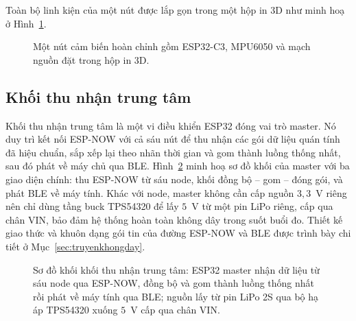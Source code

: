 \documentclass[../DoAn.tex]{subfiles}
\begin{document}
Toàn bộ linh kiện của một nút được lắp gọn trong một hộp in 3D như minh hoạ ở
Hình~\ref{fig:node_photo}.

\begin{figure}[h]
    \centering
    \caption{Một nút cảm biến hoàn chỉnh gồm ESP32-C3, MPU6050 và mạch nguồn đặt trong hộp in 3D.}
    \label{fig:node_photo}
\end{figure}

\subsection{Khối thu nhận trung tâm}
\label{subsec:hw_master}
Khối thu nhận trung tâm là một vi điều khiển ESP32 đóng vai trò master. Nó duy trì
kết nối ESP-NOW với cả sáu nút để thu nhận các gói dữ liệu quán tính đã hiệu chuẩn,
sắp xếp lại theo nhãn thời gian và gom thành luồng thống nhất, sau đó phát về máy
chủ qua BLE. Hình~\ref{fig:masterblock} minh hoạ sơ đồ khối của master với ba giao diện
chính: thu ESP-NOW từ sáu node, khối đồng bộ -- gom -- đóng gói, và phát BLE về
máy tính. Khác với node, master không cần cấp nguồn $3{,}3$~V riêng nên chỉ dùng
tầng buck TPS54320 để lấy $5$~V từ một pin LiPo riêng, cấp qua chân VIN, bảo đảm
hệ thống hoàn toàn không dây trong suốt buổi đo. Thiết kế giao
thức và khuôn dạng gói tin của đường ESP-NOW và BLE được trình bày chi tiết ở
Mục~\ref{sec:truyenkhongday}.

\begin{figure}[h]
    \centering
    \caption{Sơ đồ khối khối thu nhận trung tâm: ESP32 master nhận dữ liệu từ sáu node qua ESP-NOW, đồng bộ và gom thành luồng thống nhất rồi phát về máy tính qua BLE; nguồn lấy từ pin LiPo 2S qua bộ hạ áp TPS54320 xuống $5$~V cấp qua chân VIN.}
    \label{fig:masterblock}
\end{figure}
\end{document}
